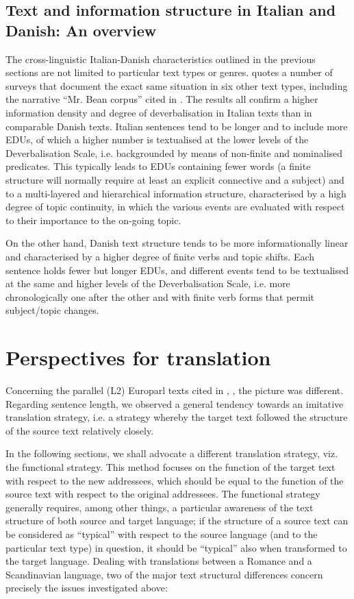 \documentclass[output=paper]{LSP/langsci}
\begin{document}
\subsection{Text and information structure in Italian and Danish: An overview}\label{sec:korzen:3.6}

The cross-linguistic Italian-Danish characteristics outlined in the previous sections are not limited to particular text types or genres. \citet{Korzen2009} quotes a number of surveys that document the exact same situation in six other text types, including the narrative ``Mr. Bean corpus'' cited in . The results all confirm a higher information density and degree of deverbalisation in Italian texts than in comparable Danish texts. Italian sentences tend to be longer and to include more EDUs, of which a higher number is textualised at the lower levels of the Deverbalisation Scale, i.e. backgrounded by means of non-finite and nominalised predicates. This typically leads to EDUs containing fewer words (a finite structure will normally require at least an explicit connective and a subject) and to a multi-layered and hierarchical information structure, characterised by a high degree of topic continuity, in which the various events are evaluated with respect to their importance to the on-going topic. 

On the other hand, Danish text structure tends to be more informationally linear and characterised by a higher degree of finite verbs and topic shifts. Each sentence holds fewer but longer EDUs, and different events tend to be textualised at the same and higher levels of the Deverbalisation Scale, i.e. more chronologically one after the other and with finite verb forms that permit subject/topic changes.


\section{Perspectives for translation}\label{sec:korzen:4}

Concerning the parallel (L2) Europarl texts cited in , , the picture was different. Regarding sentence length, we observed a general tendency towards an imitative translation strategy, i.e. a strategy whereby the target text followed the structure of the source text relatively closely. 

In the following sections, we shall advocate a different translation strategy, viz. the functional strategy. This method focuses on the function of the target text with respect to the new addressees, which should be equal to the function of the source text with respect to the original addressees. The functional strategy generally requires, among other things, a particular awareness of the text structure of both source and target language; if the structure of a source text can be considered as ``typical'' with respect to the source language (and to the particular text type) in question, it should be ``typical'' also when transformed to the target language. Dealing with translations between a Romance and a Scandinavian language, two of the major text structural differences concern precisely the issues investigated above:
\end{document}
